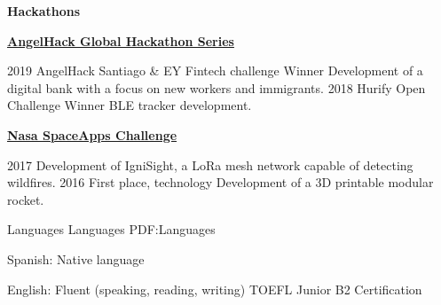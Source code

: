 \documentclass[letterpaper,yyyy,draft]{simpleresumecv}
\begin{document}
\begin{Body}
{    \Gap{}
    \Entry{}
    \textbf{Hackathons}
    {
        {
            \BulletItem{}
            \href{https://angelhack.com}{\textbf{AngelHack Global Hackathon Series}}
            \hfill
            \begin{Detail}
                \Gap{}
                \SubBulletItem{}
                2019 \- AngelHack Santiago \& EY Fintech challenge Winner \- \newline Development of a digital bank with a focus on new workers and immigrants.
                \Gap{}
                \SubBulletItem{}
                2018 \- Hurify Open Challenge Winner \- BLE tracker development.
            \end{Detail}
        }
        {
            \Gap{}
            \BulletItem{}
            \href{https://spaceappschallenge.org}{\textbf{Nasa SpaceApps Challenge}}
            \hfill
            \begin{Detail}
                \Gap{}
                \SubBulletItem{}
                2017 \- Development of IgniSight, a LoRa mesh network capable of detecting wildfires.
                \Gap{}
                \SubBulletItem{}
                2016 \- First place, technology \- Development of a 3D printable modular rocket.
            \end{Detail}
        }
    }
}


\Section
{Languages}
{Languages}
{PDF:Languages}
{
    {
        \BulletItem{}
        Spanish: Native language
    }

    \Gap{}

    {
        \BulletItem{}
        English: Fluent (speaking, reading, writing)
        \SubBulletItem{}
        TOEFL Junior B2 Certification
    }
}
\end{Body}
\end{document}
